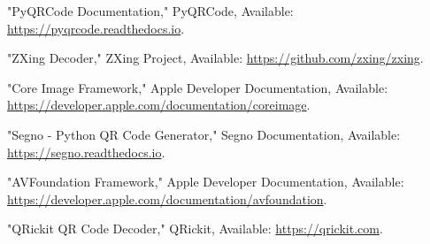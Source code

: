 \begin{thebibliography}{9}
	
	 "PyQRCode Documentation," PyQRCode, Available: \url{https://pyqrcode.readthedocs.io}.

	 "ZXing Decoder," ZXing Project, Available: \url{https://github.com/zxing/zxing}.

	 "Core Image Framework," Apple Developer Documentation, Available: \url{https://developer.apple.com/documentation/coreimage}.

	 "Segno - Python QR Code Generator," Segno Documentation, Available: \url{https://segno.readthedocs.io}.

	 "AVFoundation Framework," Apple Developer Documentation, Available: \url{https://developer.apple.com/documentation/avfoundation}.

	 "QRickit QR Code Decoder," QRickit, Available: \url{https://qrickit.com}.
\end{thebibliography}